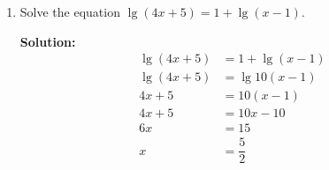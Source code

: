 \documentclass{report}
\newcommand{\sol}{\vspace{0.2cm}\textbf{Solution:}\vspace{0.2cm}}
\begin{document}
\begin{multicols*}{2}
\begin{enumerate}[leftmargin=*]
\begin{enumerate}
                        \sol{}
                        When $x = 1$, $y = 96$,
                        \begin{align*}
                            96 & = a b^1         \\
                            a  & = \dfrac{96}{b}
                        \end{align*}
                        When $x = 2$, $y = 1152$,
                        \begin{align*}
                            1152 & = a b^2             \\
                            a    & = \dfrac{1152}{b^2}
                        \end{align*}
                        \begin{align*}
                            \dfrac{96}{b} & = \dfrac{1152}{b^2} \\
                            96b           & = 1152              \\
                            b             & = 12
                        \end{align*}
                        Substituting $b = 12$ into $a = \dfrac{96}{b}$,
                        \begin{align*}
                            a & = \dfrac{96}{12} \\
                              & = 8
                        \end{align*}
                        When $x = 3$, $y = p$,
                        \begin{align*}
                            p & = 8 \cdot 12^3 \\
                              & = 13824
                        \end{align*}

                  \item Solve the equation $\lg (4 x+5)=1+\lg (x-1)$.

                        \sol{}
                        \begin{align*}
                            \lg (4x + 5) & = 1 + \lg (x - 1) \\
                            \lg (4x + 5) & = \lg 10(x - 1)   \\
                            4x + 5       & = 10(x - 1)       \\
                            4x + 5       & = 10x - 10        \\
                            6x           & = 15              \\
                            x            & = \dfrac{5}{2}
                        \end{align*}


\end{enumerate}
\end{enumerate}
\end{multicols*}
\end{document}
